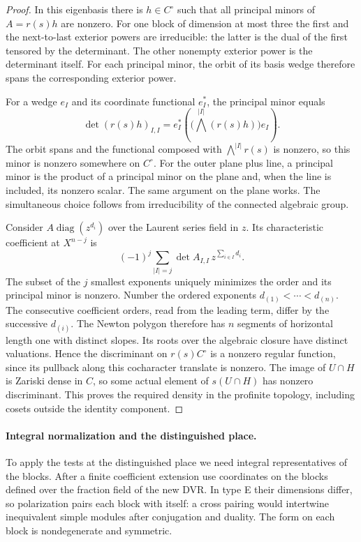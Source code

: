 \begin{proof}
In this eigenbasis there is \(h\in C^\circ\) such that all principal
minors of \(A=r(s)h\) are nonzero. For one block of dimension at
most three the first and the next-to-last exterior powers are
irreducible: the latter is the dual of the first tensored by the
determinant. The other nonempty exterior power is the determinant
itself. For each principal minor, the orbit of its basis wedge
therefore spans the corresponding exterior power.

For a wedge \(e_I\) and its coordinate functional \(e_I^*\), the principal minor equals 
\[
 \det (r(s)h)_{I,I}=e_I^*\!\left(\bigl(\textstyle\bigwedge^{|I|}(r(s)h)\bigr)e_I\right).
\]
 The orbit spans and the functional composed with \(\bigwedge^{|I|}r(s)\) is nonzero, so this minor is nonzero somewhere on \(C^\circ\).
For the outer plane plus line, a principal minor is the product of
a principal minor on the plane and, when the line is included, its
nonzero scalar. The same argument on the plane works. The simultaneous
choice follows from irreducibility of the connected algebraic group.

Consider \(A\operatorname{diag}(z^{d_i})\) over the Laurent
series field in \(z\). Its characteristic coefficient at \(X^{n-j}\)
is
\[
 (-1)^j\sum_{|I|=j}\det A_{I,I}\,z^{\sum_{i\in I} d_i}.
\]
The subset of the \(j\) smallest exponents uniquely minimizes
the order and its principal minor is nonzero. Number the ordered
exponents \(d_{(1)}<\cdots<d_{(n)}\). The consecutive coefficient
orders, read from the leading term, differ by the successive
\(d_{(i)}\). The Newton polygon therefore has \(n\) segments of
horizontal length one with distinct slopes. Its roots
over the algebraic closure have distinct valuations. Hence the
discriminant on \(r(s)C^\circ\) is a nonzero regular function, since
its pullback along this cocharacter translate is nonzero.
The image of \(U\cap H\) is Zariski dense in \(C\), so some actual
element of \(s(U\cap H)\) has nonzero discriminant. This proves the
required density in the profinite topology, including cosets outside
the identity component.

\end{proof}

\paragraph{Integral normalization and the distinguished place.}
To apply the tests at the distinguished place we need integral representatives of the
blocks. After a finite coefficient extension use coordinates on the blocks
defined over the fraction field of the new DVR. In type E their
dimensions differ, so polarization pairs each block with itself:
a cross pairing would intertwine inequivalent simple modules after
conjugation and duality. The form on each block is nondegenerate
and symmetric.

